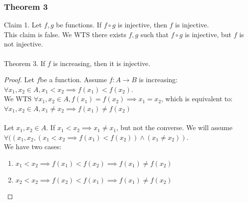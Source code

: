 \documentclass{article}
\begin{document}
\subsubsection{Theorem 3}
Claim 1. Let $f,g$ be functions. If $f \circ g$ is injective, then $f$ is injective.\\
This claim is false. We WTS there exists $f, g$ such that $f \circ g$ is injective, but $f$ is not injective.
\\
\\
Theorem 3. If $f$ is increasing, then it is injective.
\begin{proof}
Let $f$be a function. Assume $f: A \to B$ is increasing: $\forall x_1, x_2 \in A, x_1 < x_2 \implies f(x_1) < f(x_2)$.\\
We WTS $\forall x_1, x_2 \in A, f(x_1) = f(x_2) \implies x_1 = x_2$, which is equivalent to:\\
$\forall x_1, x_2 \in A, x_1 \neq x_2 \implies f(x_1) \neq f(x_2)$\\
\\
Let $x_1, x_2 \in A$. If $x_1 < x_2 \implies x_1 \neq x_1$, but not the converse. We will assume $\forall ((x_1, x_2, (x_1 < x_2 \implies f(x_1) < f(x_2)) \land (x_1 \neq x_2))$.\\
We have two cases:
\begin{enumerate}
    \item $x_1 < x_2 \implies f(x_1) < f(x_2) \implies f(x_1) \neq f(x_2)$
    \item $x_2 < x_2 \implies f(x_2) < f(x_1) \implies f(x_1) \neq f(x_2)$
\end{enumerate}
\end{proof}
\end{document}
